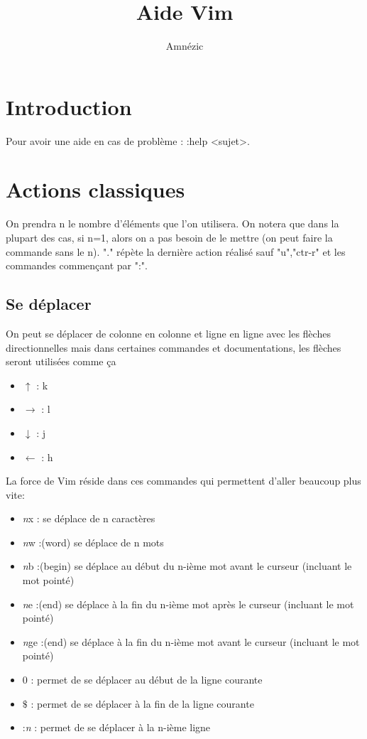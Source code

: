 \documentclass{article}
\author{Amnézic}
\date{}
\title{Aide Vim}
\begin{document}
\maketitle
\newpage
\tableofcontents
\newpage
\section{Introduction}
Pour avoir une aide en cas de problème : :help <sujet>.





\section{Actions classiques}
On prendra n le nombre d'éléments que l'on utilisera. On notera que dans la plupart des cas, si n=1, alors on a pas besoin de le mettre (on peut faire la commande sans le n). "." répète la dernière action réalisé sauf "u","ctr-r" et les commandes commençant par ":".








\subsection{Se déplacer}
On peut se déplacer de colonne en colonne et ligne en ligne avec les flèches directionnelles mais dans certaines commandes et documentations, les flèches seront utilisées comme ça
\begin{itemize}
    \item $\uparrow$ : k
    \item $\rightarrow$ : l
    \item $\downarrow$ : j
    \item $\leftarrow$ : h
\end{itemize}
La force de Vim réside dans ces commandes qui permettent d'aller beaucoup plus vite:
\begin{itemize}
    \item \textit{n}x : se déplace de n caractères
    \item \textit{n}w :(word) se déplace de n mots
    \item \textit{n}b :(begin) se déplace au début du n-ième mot avant le curseur (incluant le mot pointé)
    \item \textit{n}e :(end) se déplace à la fin du n-ième mot après le curseur (incluant le mot pointé)
    \item \textit{n}ge :(end) se déplace à la fin du n-ième mot avant le curseur (incluant le mot pointé)
    \item 0 : permet de se déplacer au début de la ligne courante
    \item $\$$ : permet de se déplacer à la fin de la ligne courante
    \item :\textit{n} : permet de se déplacer à la n-ième ligne
\end{itemize}
\end{document}
